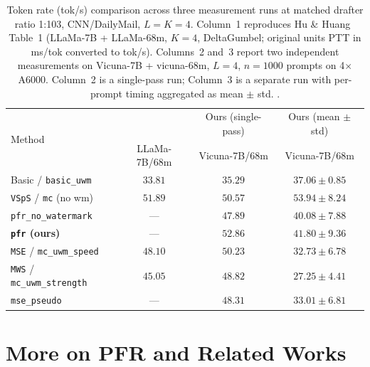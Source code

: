 \documentclass{article}
\theoremstyle{plain}
\theoremstyle{definition}
\begin{document}
\begin{table}[h]
\centering
\caption{Token rate (tok/s) comparison across three measurement runs at matched drafter ratio 1:103, CNN/DailyMail, $L=K=4$.
Column~1 reproduces Hu \& Huang~\cite{hu2024inevitable} Table~1 (LLaMa-7B + LLaMa-68m, $K=4$, DeltaGumbel; original units PTT in ms/tok converted to tok/s).
Columns~2 and~3 report two independent measurements on Vicuna-7B + vicuna-68m, $L=4$, $n=1000$ prompts on 4$\times$A6000.
Column~2 is a single-pass run; Column~3 is a separate run with per-prompt timing aggregated as mean $\pm$ std.
.}
\label{tab:token_rate_three_way}
\small
\setlength{\tabcolsep}{6pt}
\begin{tabular}{l c c c}
\toprule
\multirow{2}{*}{Method}
 & \cite{hu2024inevitable}
 & Ours (single-pass)
 & Ours (mean $\pm$ std) \\
 & LLaMa-7B/68m & Vicuna-7B/68m & Vicuna-7B/68m \\
\midrule
Basic / \texttt{basic\_uwm}             & $33.81$ & $35.29$ & $37.06 \pm 0.85$ \\
\texttt{VSpS} / \texttt{mc} (no wm)     & $51.89$ & $50.57$ & $53.94 \pm 8.24$ \\
\texttt{pfr\_no\_watermark}              & ---     & $47.89$ & $40.08 \pm 7.88$ \\
\textbf{\texttt{pfr} (ours)}             & ---     & $\mathbf{52.86}$ & $\mathbf{41.80 \pm 9.36}$ \\
\texttt{MSE} / \texttt{mc\_uwm\_speed}   & $48.10$ & $50.23$ & $32.73 \pm 6.78$ \\
\texttt{MWS} / \texttt{mc\_uwm\_strength} & $45.05$ & $48.82$ & $27.25 \pm 4.41$ \\
\texttt{mse\_pseudo}~\cite{he2026improving} & ---  & $48.31$ & $33.01 \pm 6.81$ \\
\bottomrule
\end{tabular}
\end{table}


\newpage













\newpage



\appendix



\section{More on PFR and Related Works}
\label{app::Poisson}
\end{document}
